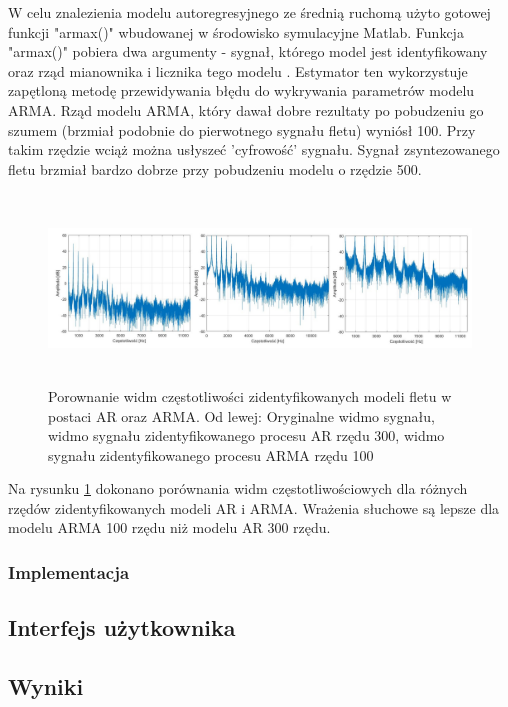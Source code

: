 W celu znalezienia modelu autoregresyjnego ze średnią ruchomą użyto gotowej funkcji "armax()" wbudowanej w środowisko symulacyjne Matlab. Funkcja "armax()" pobiera dwa argumenty - sygnał, którego model jest identyfikowany oraz rząd mianownika i licznika tego modelu \cite{armax}. Estymator ten wykorzystuje zapętloną metodę przewidywania błędu do wykrywania parametrów modelu ARMA. Rząd modelu ARMA, który dawał dobre rezultaty po pobudzeniu go szumem (brzmiał podobnie do pierwotnego sygnału fletu) wyniósł 100. Przy takim rzędzie wciąż można usłyszeć 'cyfrowość' sygnału. Sygnał zsyntezowanego fletu brzmiał bardzo dobrze przy pobudzeniu modelu o rzędzie 500.

\begin{figure}[H]
	\centering
	\includegraphics[width=12cm, height=5cm]{grafiki/Model_AR_300}
	\captionsetup{justification=centering}
	\caption{Porownanie widm częstotliwości zidentyfikowanych modeli fletu w postaci AR oraz ARMA. Od lewej: Oryginalne widmo sygnału, widmo sygnału zidentyfikowanego procesu AR rzędu 300, widmo sygnału zidentyfikowanego procesu ARMA rzędu 100}
	\label{rys:por_ar_arma}
\end{figure}
Na rysunku \ref{rys:por_ar_arma} dokonano porównania widm częstotliwościowych dla różnych rzędów zidentyfikowanych modeli AR i ARMA. Wrażenia słuchowe są lepsze dla modelu ARMA 100 rzędu niż modelu AR 300 rzędu.

\subsubsection{Implementacja}

\subsection{Interfejs użytkownika}

\subsection{Wyniki}